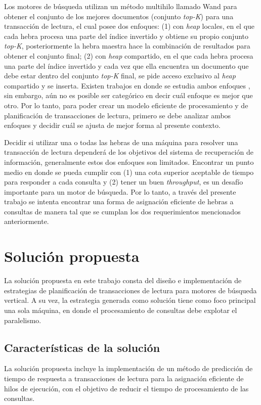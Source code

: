 Los motores de búsqueda utilizan un método multihilo llamado Wand para obtener el conjunto de los mejores documentos (conjunto \textit{top-K}) para una transacción de lectura, el cual posee dos enfoques: (1) con \textit{heap} locales, en el que cada hebra procesa una parte del índice invertido y obtiene su propio conjunto \textit{top-K}, posteriormente la hebra maestra hace la combinación de resultados para obtener el conjunto final; (2) con \textit{heap} compartido, en el que cada hebra procesa una parte del índice invertido y cada vez que ella encuentra un documento que debe estar dentro del conjunto \textit{top-K} final, se pide acceso exclusivo al \textit{heap} compartido y se inserta. Existen trabajos en donde se estudia ambos enfoques \citep{Rojas:2013}, sin embargo, aún no es posible ser categórico en decir cuál enfoque es mejor que otro. Por lo tanto, para poder crear un modelo eficiente de procesamiento y de planificación de transacciones de lectura, primero se debe analizar ambos enfoques y decidir cuál se ajusta de mejor forma al presente contexto.

Decidir si utilizar una o todas las hebras de una máquina para resolver una transacción de lectura dependerá de los objetivos del sistema de recuperación de información, generalmente estos dos enfoques son limitados. Encontrar un punto medio en donde se pueda cumplir con (1) una cota superior aceptable de tiempo para responder a cada consulta y (2) tener un buen \textit{throughput}, es un desafío importante para un motor de búsqueda. Por lo tanto, a través del presente trabajo se intenta encontrar una forma de asignación eficiente de hebras a consultas de manera tal que se cumplan los dos requerimientos mencionados anteriormente. 


\section{Solución propuesta}
\label{intro:solucionpropuesta}
La solución propuesta en este trabajo consta del diseño e implementación de estrategias de planificación de transacciones de lectura para motores de búsqueda vertical. A su vez, la estrategia generada como solución tiene como foco principal una sola máquina, en donde el procesamiento de consultas debe explotar el paralelismo. 


\subsection{Caracter\'isticas de la solución}
\label{intro:caracteristicassolucion}
La solución propuesta incluye la implementación de un método de predicción de tiempo de respuesta a transacciones de lectura para la asignación eficiente de hilos de ejecución, con el objetivo de reducir el tiempo de procesamiento de las consultas. 

